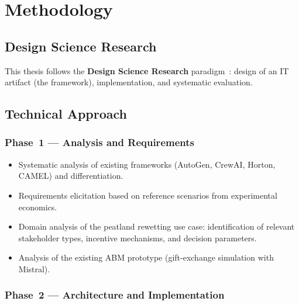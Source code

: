 \documentclass[12pt, a4paper]{article}
\begin{document}
\section{Methodology}

\subsection{Design Science Research}

This thesis follows the \textbf{Design Science Research} paradigm~\cite{hevner2004}: design of an IT artifact (the framework), implementation, and systematic evaluation.

\subsection{Technical Approach}

\subsubsection*{Phase~1 --- Analysis and Requirements}
\begin{itemize}
    \item Systematic analysis of existing frameworks (AutoGen, CrewAI, Horton, CAMEL) and differentiation.
    \item Requirements elicitation based on reference scenarios from experimental economics.
    \item Domain analysis of the peatland rewetting use case: identification of relevant stakeholder types, incentive mechanisms, and decision parameters.
    \item Analysis of the existing ABM prototype (gift-exchange simulation with Mistral).
\end{itemize}

\subsubsection*{Phase~2 --- Architecture and Implementation}
\end{document}
